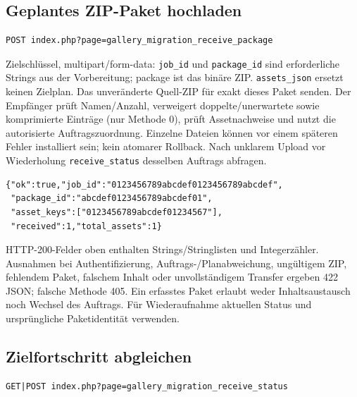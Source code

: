 \documentclass[11pt,a4paper]{article}
\newcommand{\codeword}[1]{\nolinkurl{#1}}
\begin{document}
\subsection{\texorpdfstring{Geplantes ZIP-Paket hochladen}{Geplantes ZIP-Paket hochladen}}

\label{api352:migration-receive-package}

\begin{lstlisting}[language={}]
POST index.php?page=gallery_migration_receive_package
\end{lstlisting}

Zielschlüssel, multipart/form-data: \codeword{job_id} und \codeword{package_id} sind
erforderliche Strings aus der Vorbereitung; package ist das binäre ZIP.
\codeword{assets_json} ersetzt keinen Zielplan. Das unveränderte Quell-ZIP für exakt dieses
Paket senden. Der Empfänger prüft Namen/Anzahl, verweigert doppelte/unerwartete sowie
komprimierte Einträge (nur Methode 0), prüft Assetnachweise und nutzt die autorisierte
Auftragszuordnung. Einzelne Dateien können vor einem späteren Fehler installiert sein; kein
atomarer Rollback. Nach unklarem Upload vor Wiederholung \codeword{receive_status} desselben
Auftrags abfragen.

\begin{lstlisting}[language={}]
{"ok":true,"job_id":"0123456789abcdef0123456789abcdef",
 "package_id":"abcdef0123456789abcdef01",
 "asset_keys":["0123456789abcdef01234567"],
 "received":1,"total_assets":1}
\end{lstlisting}

HTTP-200-Felder oben enthalten Strings/Stringlisten und Integerzähler. Ausnahmen bei
Authentifizierung, Auftrags-/Planabweichung, ungültigem ZIP, fehlendem Paket, falschem
Inhalt oder unvollständigem Transfer ergeben 422 JSON; falsche Methode 405. Ein erfasstes
Paket erlaubt weder Inhaltsaustausch noch Wechsel des Auftrags. Für Wiederaufnahme aktuellen
Status und ursprüngliche Paketidentität verwenden.

\subsection{\texorpdfstring{Zielfortschritt abgleichen}{Zielfortschritt abgleichen}}

\label{api352:migration-receive-status}

\begin{lstlisting}[language={}]
GET|POST index.php?page=gallery_migration_receive_status
\end{lstlisting}
\end{document}
